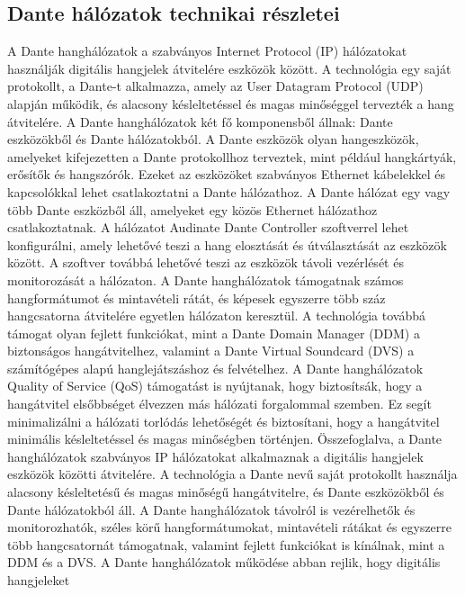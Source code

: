 \subsection{Dante hálózatok technikai részletei}
A Dante hanghálózatok a szabványos Internet Protocol (IP) hálózatokat használják
digitális hangjelek átvitelére eszközök között. A technológia egy saját
protokollt, a Dante-t alkalmazza, amely az User Datagram Protocol (UDP) alapján
működik, és alacsony késleltetéssel és magas minőséggel tervezték a hang
átvitelére. A Dante hanghálózatok két fő komponensből állnak: Dante eszközökből
és Dante hálózatokból. A Dante eszközök olyan hangeszközök, amelyeket
kifejezetten a Dante protokollhoz terveztek, mint például hangkártyák, erősítők
és hangszórók. Ezeket az eszközöket szabványos Ethernet kábelekkel és
kapcsolókkal lehet csatlakoztatni a Dante hálózathoz. A Dante hálózat egy vagy
több Dante eszközből áll, amelyeket egy közös Ethernet hálózathoz
csatlakoztatnak. A hálózatot Audinate Dante Controller szoftverrel lehet
konfigurálni, amely lehetővé teszi a hang elosztását és útválasztását az
eszközök között. A szoftver továbbá lehetővé teszi az eszközök távoli vezérlését
és monitorozását a hálózaton. A Dante hanghálózatok támogatnak számos
hangformátumot és mintavételi rátát, és képesek egyszerre több száz hangcsatorna
átvitelére egyetlen hálózaton keresztül. A technológia továbbá támogat olyan
fejlett funkciókat, mint a Dante Domain Manager (DDM) a biztonságos
hangátvitelhez, valamint a Dante Virtual Soundcard (DVS) a számítógépes alapú
hanglejátszáshoz és felvételhez. A Dante hanghálózatok Quality of Service (QoS)
támogatást is nyújtanak, hogy biztosítsák, hogy a hangátvitel elsőbbséget
élvezzen más hálózati forgalommal szemben. Ez segít minimalizálni a hálózati
torlódás lehetőségét és biztosítani, hogy a hangátvitel minimális késleltetéssel
és magas minőségben történjen. Összefoglalva, a Dante hanghálózatok szabványos
IP hálózatokat alkalmaznak a digitális hangjelek eszközök közötti átvitelére. A
technológia a Dante nevű saját protokollt használja alacsony késleltetésű és
magas minőségű hangátvitelre, és Dante eszközökből és Dante hálózatokból áll. A
Dante hanghálózatok távolról is vezérelhetők és monitorozhatók, széles körű
hangformátumokat, mintavételi rátákat és egyszerre több hangcsatornát támogatnak,
valamint fejlett funkciókat is kínálnak, mint a DDM és a DVS.
A Dante hanghálózatok működése abban rejlik, hogy digitális hangjeleket
